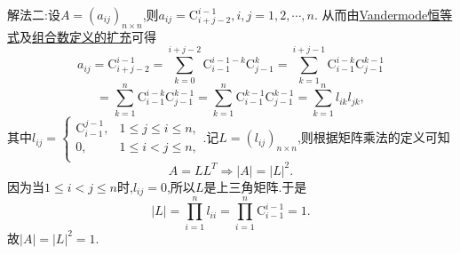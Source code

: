 \documentclass[../../main.tex]{subfiles}%
\begin{document}
\begin{solution}
{\color{blue}解法二:}设$A=(a_{ij})_{n\times n}$,则$a_{ij}=\mathrm{C}_{i+j-2}^{i-1} , i,j=1,2,\cdots,n$.
从而由\hyperref[theorem:Vandermode恒等式]{Vandermode恒等式}及\hyperref[Basis-of-Analytics-definition:组合数定义的扩充]{组合数定义的扩充}可得
\[
a_{ij}=\mathrm{C}_{i+j-2}^{i-1}=\sum_{k=0}^{i+j-2}{\mathrm{C}_{i-1}^{i-1-k}\mathrm{C}_{j-1}^{k}}=\sum_{k=1}^{i+j-1}{\mathrm{C}_{i-1}^{i-k}\mathrm{C}_{j-1}^{k-1}}
\]
\[
=\sum_{k=1}^n{\mathrm{C}_{i-1}^{i-k}\mathrm{C}_{j-1}^{k-1}}=\sum_{k=1}^n{\mathrm{C}_{i-1}^{k-1}\mathrm{C}_{j-1}^{k-1}}=\sum_{k=1}^n{l_{ik}l_{jk}},
\]
其中$l_{ij}=\begin{cases}
\mathrm{C}_{i-1}^{j-1}, & 1\leqslant j\leqslant i\leqslant n, \\
0, & 1\leqslant i<j\leqslant n, \\
\end{cases}$.记$L=\left( l_{ij} \right) _{n\times n}$,则根据矩阵乘法的定义可知
\[
A=LL^T\Rightarrow \left| A \right|=\left| L \right|^2.
\]
因为当$1\leqslant i<j\leqslant n$时,$l_{ij}=0$,所以$L$是上三角矩阵.于是
\[
\left| L \right|=\prod_{i=1}^n{l_{ii}}=\prod_{i=1}^n{\mathrm{C}_{i-1}^{i-1}}=1.
\]
故$\left| A \right|=\left| L \right|^2=1$.

\end{solution}
\end{document}

